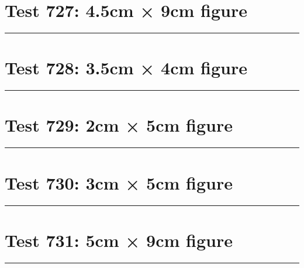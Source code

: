 \documentclass[a4paper,11pt]{article}
\begin{document}
\section*{Test 727: 4.5cm × 9cm figure}
\begin{swarmwrap}%
  \begin{minipage}[t]{4cm}
    \centering
    \rule{\linewidth}{9cm}
  \end{minipage}%
\end{swarmwrap}%
\swarmwrapnext
\lipsum[115]
\lipsum[116]
\lipsum[117]
\lipsum[118]
\lipsum[119]
\lipsum[120]
\section*{Test 728: 3.5cm × 4cm figure}
\begin{swarmwrap}%
  \begin{minipage}[t]{3cm}
    \centering
    \rule{\linewidth}{4cm}
  \end{minipage}%
\end{swarmwrap}%
\swarmwrapnext
\lipsum[146]
\lipsum[147]
\lipsum[148]
\section*{Test 729: 2cm × 5cm figure}
\begin{swarmwrap}%
  \begin{minipage}[t]{2cm}
    \centering
    \rule{\linewidth}{5cm}
  \end{minipage}%
\end{swarmwrap}%
\swarmwrapnext
\lipsum[10]
\lipsum[11]
\lipsum[12]
\lipsum[13]
\lipsum[14]
\section*{Test 730: 3cm × 5cm figure}
\begin{swarmwrap}%
  \begin{minipage}[t]{3cm}
    \centering
    \rule{\linewidth}{5cm}
  \end{minipage}%
\end{swarmwrap}%
\swarmwrapnext
\lipsum[45]
\lipsum[46]
\lipsum[47]
\lipsum[48]
\lipsum[49]
\section*{Test 731: 5cm × 9cm figure}
\begin{swarmwrap}%
  \begin{minipage}[t]{5cm}
    \centering
    \rule{\linewidth}{9cm}
  \end{minipage}%
\end{swarmwrap}%
\swarmwrapnext
\lipsum[142]
\lipsum[143]
\lipsum[144]
\lipsum[145]
\lipsum[146]
\lipsum[147]
\end{document}
